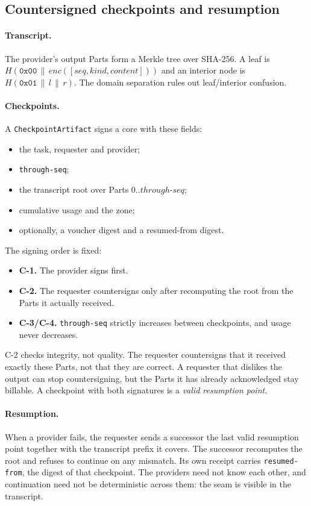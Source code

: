 \subsection{Countersigned checkpoints and resumption}
\label{sec:checkpoints}
\paragraph{Transcript.}
The provider's output Parts form a Merkle tree over SHA-256. A leaf is
$H(\mathtt{0x00}\,\|\,\mathit{enc}([\mathit{seq},\mathit{kind},
\mathit{content}]))$ and an interior node is
$H(\mathtt{0x01}\,\|\,l\,\|\,r)$. The domain separation rules out
leaf/interior confusion.

\paragraph{Checkpoints.}
A \texttt{CheckpointArtifact} signs a core with these fields:
\begin{itemize}
\item the task, requester and provider;
\item \texttt{through-seq};
\item the transcript root over Parts $0..\mathit{through\text{-}seq}$;
\item cumulative usage and the zone;
\item optionally, a voucher digest and a resumed-from digest.
\end{itemize}
The signing order is fixed:
\begin{itemize}
\item \textbf{C-1.} The provider signs first.
\item \textbf{C-2.} The requester countersigns only after recomputing the
  root from the Parts it actually received.
\item \textbf{C-3/C-4.} \texttt{through-seq} strictly increases between
  checkpoints, and usage never decreases.
\end{itemize}
C-2 checks integrity, not quality. The requester countersigns that it
received exactly these Parts, not that they are correct. A requester that
dislikes the output can stop countersigning, but the Parts it has already
acknowledged stay billable.
A checkpoint with both signatures is a \emph{valid resumption point}.

\paragraph{Resumption.}
When a provider fails, the requester sends a successor the last valid
resumption point together with the transcript prefix it covers. The
successor recomputes the root and refuses to continue on any mismatch.
Its own receipt carries \texttt{resumed-from}, the digest of that
checkpoint. The providers need not know each other, and continuation need
not be deterministic across them: the seam is visible in the transcript.

